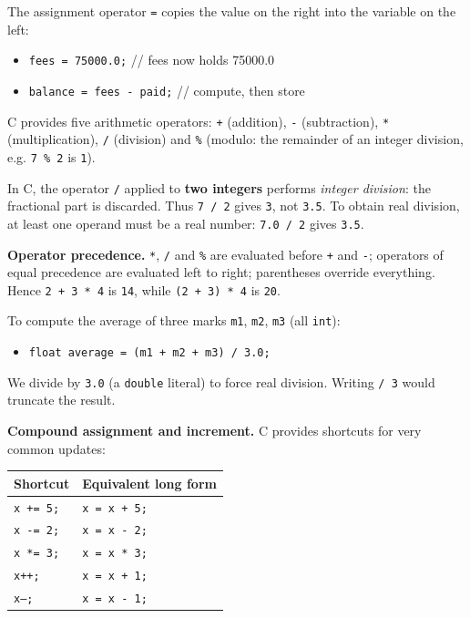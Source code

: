 \documentclass[11pt]{article}
\newcommand{\cle}[1]{{\popxbold\color{popdark}#1}}
\begin{document}
The \cle{assignment} operator \texttt{=} copies the value on the right into the variable on the left:

\begin{itemize}
\item \texttt{fees = 75000.0;} \quad // fees now holds 75000.0
\item \texttt{balance = fees - paid;} \quad // compute, then store
\end{itemize}

C provides five arithmetic operators: \texttt{+} (addition), \texttt{-} (subtraction), \texttt{*} (multiplication), \texttt{/} (division) and \texttt{\%} (\cle{modulo}: the remainder of an integer division, e.g. \texttt{7 \% 2} is \texttt{1}).

\begin{propriete}
In C, the operator \texttt{/} applied to \textbf{two integers} performs \emph{integer division}: the fractional part is discarded. Thus \texttt{7 / 2} gives \texttt{3}, not \texttt{3.5}. To obtain real division, at least one operand must be a real number: \texttt{7.0 / 2} gives \texttt{3.5}.
\end{propriete}

\textbf{Operator precedence.} \texttt{*}, \texttt{/} and \texttt{\%} are evaluated before \texttt{+} and \texttt{-}; operators of equal precedence are evaluated left to right; parentheses override everything. Hence \texttt{2 + 3 * 4} is \texttt{14}, while \texttt{(2 + 3) * 4} is \texttt{20}.

\begin{exemplebox}
To compute the average of three marks \texttt{m1}, \texttt{m2}, \texttt{m3} (all \texttt{int}):

\begin{itemize}
\item \texttt{float average = (m1 + m2 + m3) / 3.0;}
\end{itemize}

We divide by \texttt{3.0} (a \texttt{double} literal) to force real division. Writing \texttt{/ 3} would truncate the result.
\end{exemplebox}

\textbf{Compound assignment and increment.} C provides shortcuts for very common updates:

\begin{center}
\begin{tabularx}{\linewidth}{|l|X|}
\hline
\rowcolor{popblueL} \textbf{Shortcut} & \textbf{Equivalent long form} \\
\hline
\texttt{x += 5;} & \texttt{x = x + 5;} \\
\hline
\texttt{x -= 2;} & \texttt{x = x - 2;} \\
\hline
\texttt{x *= 3;} & \texttt{x = x * 3;} \\
\hline
\texttt{x++;} & \texttt{x = x + 1;} \\
\hline
\texttt{x--;} & \texttt{x = x - 1;} \\
\hline
\end{tabularx}
\end{center}
\end{document}
